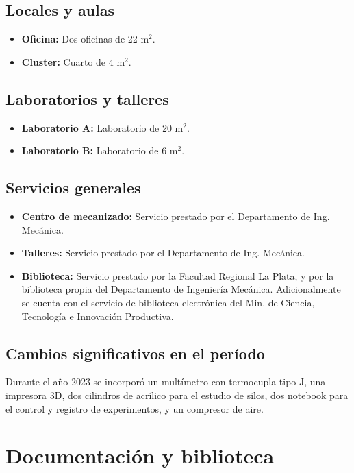 \documentclass[a4paper,11pt,twoside,final,titlepage,onecolumn,openright]{report}
\begin{document}
\subsection{Locales y aulas}

\begin{itemize}
 \item {\bf Oficina:} Dos oficinas de 22 m$^2$. 
 \item {\bf Cluster:} Cuarto de 4 m$^2$. 
\end{itemize}

\subsection{Laboratorios y talleres}

\begin{itemize}
 \item {\bf Laboratorio A:} Laboratorio de 20 m$^2$.
 \item {\bf Laboratorio B:} Laboratorio de 6 m$^2$.
\end{itemize}

\subsection{Servicios generales}

\begin{itemize}
 \item {\bf Centro de mecanizado:} Servicio prestado por el Departamento de Ing. Mecánica.
 \item {\bf Talleres:} Servicio prestado por el Departamento de Ing. Mecánica.
 \item {\bf Biblioteca:} Servicio prestado por la Facultad Regional La Plata, y por la biblioteca propia del Departamento de Ingeniería Mecánica. Adicionalmente se cuenta con el servicio de biblioteca electrónica del Min. de Ciencia, Tecnología e Innovación Productiva. 
\end{itemize}

\subsection{Cambios significativos en el período}
Durante el año 2023 se incorporó un multímetro con termocupla tipo J, una impresora 3D, dos cilindros de acrílico para el estudio de silos, dos notebook para el control y registro de experimentos, y un compresor de aire.

\section{Documentación y biblioteca}
\end{document}
